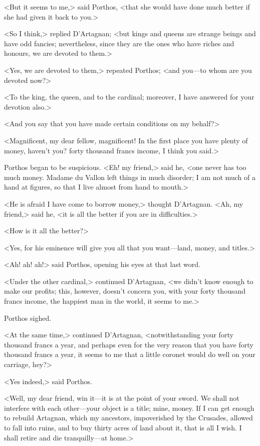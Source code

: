 <But it seems to me,> said Porthos, <that she would have done much better if she had given it back to you.>

<So I think,> replied D'Artagnan; <but kings and queens are strange beings and have odd fancies; nevertheless, since they are the ones who have riches and honours, we are devoted to them.>

<Yes, we are devoted to them,> repeated Porthos; <and you—to whom are you devoted now?>

<To the king, the queen, and to the cardinal; moreover, I have answered for your devotion also.>

<And you say that you have made certain conditions on my behalf?>

<Magnificent, my dear fellow, magnificent! In the first place you have plenty of money, haven't you? forty thousand francs income, I think you said.>

Porthos began to be suspicious. <Eh! my friend,> said he, <one never has too much money. Madame du Vallon left things in much disorder; I am not much of a hand at figures, so that I live almost from hand to mouth.>

<He is afraid I have come to borrow money,> thought D'Artagnan. <Ah, my friend,> said he, <it is all the better if you are in difficulties.>

<How is it all the better?>

<Yes, for his eminence will give you all that you want—land, money, and titles.>

<Ah! ah! ah!> said Porthos, opening his eyes at that last word.

<Under the other cardinal,> continued D'Artagnan, <we didn't know enough to make our profits; this, however, doesn't concern you, with your forty thousand francs income, the happiest man in the world, it seems to me.>

Porthos sighed.

<At the same time,> continued D'Artagnan, <notwithstanding your forty thousand francs a year, and perhaps even for the very reason that you have forty thousand francs a year, it seems to me that a little coronet would do well on your carriage, hey?>

<Yes indeed,> said Porthos.

<Well, my dear friend, win it—it is at the point of your sword. We shall not interfere with each other—your object is a title; mine, money. If I can get enough to rebuild Artagnan, which my ancestors, impoverished by the Crusades, allowed to fall into ruins, and to buy thirty acres of land about it, that is all I wish. I shall retire and die tranquilly—at home.>


